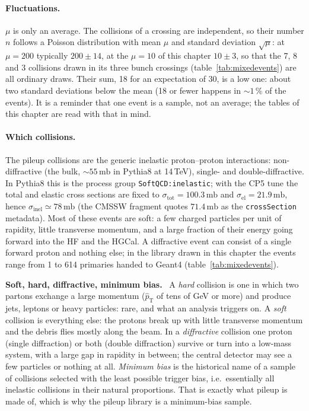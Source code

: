 \documentclass[11pt,a4paper]{article}
\newcommand{\code}[1]{\texttt{#1}}
\newcommand{\mb}{\,\mathrm{mb}}
\newcommand{\sigin}{\ensuremath{\sigma_{\mathrm{inel}}}}
\newcommand{\ptHat}{\ensuremath{\hat{p}_{\mathrm{T}}}}
\newenvironment{plainwords}[1][In plain words]{%
  \par\medskip\noindent\setlength{\fboxsep}{6pt}\setlength{\fboxrule}{0.6pt}%
  \begin{lrbox}{\plainbox}\begin{minipage}{\dimexpr\textwidth-2\fboxsep-2\fboxrule\relax}\small
  \textbf{\textcolor{plainrule}{#1.}}\ \ignorespaces}{%
  \end{minipage}\end{lrbox}\noindent\fcolorbox{plainrule}{plainbg}{\usebox{\plainbox}}\par\medskip}
\begin{document}
\paragraph{Fluctuations.} $\mu$ is only an average. The collisions of a crossing are independent, so their
number $n$ follows a Poisson distribution with mean $\mu$ and standard deviation $\sqrt{\mu}$: at $\mu=200$
typically $200\pm14$, at the $\mu=10$ of this chapter $10\pm3$, so that the 7, 8 and 3 collisions drawn
in its three bunch crossings (table~\ref{tab:mixedevents}) are all ordinary draws. Their sum, 18 for an
expectation of 30, is a low one: about two standard deviations below the mean (18 or fewer happens in
$\sim1$\,\% of the events). It is a reminder that one event is a sample, not an average; the tables of this
chapter are read with that in mind.

\paragraph{Which collisions.} The pileup collisions are the generic inelastic proton--proton interactions:
non-diffractive (the bulk, $\sim 55\mb$ in Pythia8 at 14\,TeV), single- and double-diffractive. In
Pythia8 this is the process group \code{SoftQCD:inelastic}; with the CP5 tune the total and elastic cross
sections are fixed to $\sigma_{\mathrm{tot}} = 100.3\mb$ and $\sigma_{\mathrm{el}} = 21.9\mb$, hence
$\sigin \simeq 78\mb$ (the CMSSW fragment quotes $71.4\mb$ as the \code{crossSection} metadata). Most of
these events are soft: a few charged particles per unit of rapidity, little transverse momentum, and a large
fraction of their energy going forward into the HF and the HGCal. A diffractive event can consist of a single
forward proton and nothing else; in the library drawn in this chapter the events range from 1 to 614 primaries
handed to Geant4 (table~\ref{tab:mixedevents}).

\begin{plainwords}[Soft, hard, diffractive, minimum bias]
A \emph{hard} collision is one in which two partons exchange a large momentum ($\ptHat$ of tens of GeV or
more) and produce jets, leptons or heavy particles: rare, and what an analysis triggers on. A \emph{soft}
collision is everything else: the protons break up with little transverse momentum and the debris flies
mostly along the beam. In a \emph{diffractive} collision one proton (single diffraction) or both (double
diffraction) survive or turn into a low-mass system, with a large gap in rapidity in between; the central
detector may see a few particles or nothing at all. \emph{Minimum bias} is the historical name of a sample
of collisions selected with the least possible trigger bias, i.e.\ essentially all inelastic collisions in
their natural proportions. That is exactly what pileup is made of, which is why the pileup library is a
minimum-bias sample.
\end{plainwords}
\end{document}
